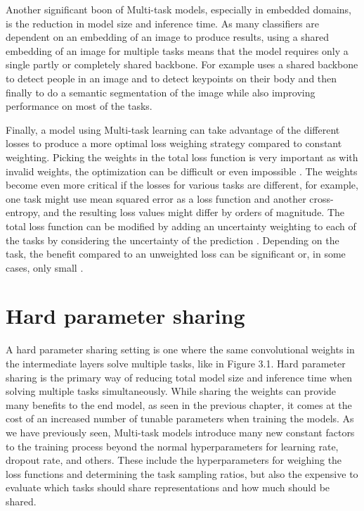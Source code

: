 Another significant boon of Multi-task models, especially in embedded domains, is the reduction in model size and inference time.
As many classifiers are dependent on an embedding of an image to produce results, using a shared embedding of an image for multiple tasks means that the model requires only a single partly or completely shared backbone.
For example \citep{multiPoseNet} uses a shared backbone to detect people in an image and to detect keypoints on their body and then finally to do a semantic segmentation of the image while also improving performance on most of the tasks.

Finally, a model using Multi-task learning can take advantage of the different losses to produce a more optimal loss weighing strategy compared to constant weighting.
Picking the weights in the total loss function is very important as with invalid weights, the optimization can be difficult or even impossible \citep{lossWeighting}.
The weights become even more critical if the losses for various tasks are different, for example, one task might use mean squared error as a loss function and another cross-entropy, and the resulting loss values might differ by orders of magnitude.
The total loss function can be modified by adding an uncertainty weighting to each of the tasks by considering the uncertainty of the prediction \citep{usingUncertaintyToWeighLosses}.
Depending on the task, the benefit compared to an unweighted loss can be significant \citep{usingUncertaintyToWeighLosses} or, in some cases, only small \citep{lossWeighting}.

\section{Hard parameter sharing}
A hard parameter sharing setting is one where the same convolutional weights in the intermediate layers solve multiple tasks, like in Figure 3.1.
Hard parameter sharing is the primary way of reducing total model size and inference time when solving multiple tasks simultaneously.
While sharing the weights can provide many benefits to the end model, as seen in the previous chapter, it comes at the cost of an increased number of tunable parameters when training the models.
As we have previously seen, Multi-task models introduce many new constant factors to the training process beyond the normal hyperparameters for learning rate, dropout rate, and others.
These include the hyperparameters for weighing the loss functions and determining the task sampling ratios, but also the expensive to evaluate which tasks should share representations and how much should be shared.

